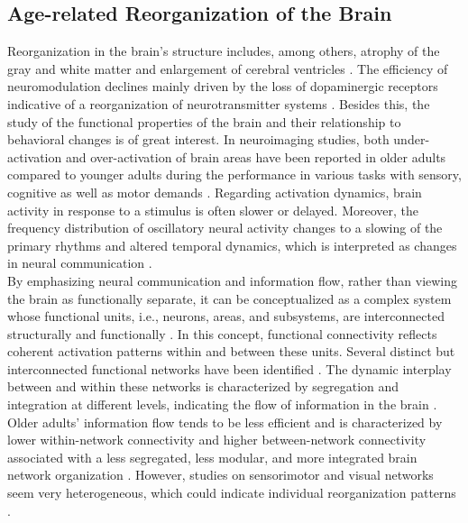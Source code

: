 \subsection{Age-related Reorganization of the Brain}
\label{theory:aging:brain}
Reorganization in the brain's structure includes, among others, atrophy of the gray and white matter and enlargement of cerebral ventricles \cite{Fjell2010}. The efficiency of neuromodulation declines mainly driven by the loss of dopaminergic receptors indicative of a reorganization of neurotransmitter systems \cite{Li2001}. Besides this, the study of the functional properties of the brain and their relationship to behavioral changes is of great interest. In neuroimaging studies, both under-activation and over-activation of brain areas have been reported in older adults compared to younger adults during the performance in various tasks with sensory, cognitive as well as motor demands \cite{Reuter-Lorenz2010, Sala-Llonch2015}. Regarding activation dynamics, brain activity in response to a stimulus is often slower or delayed. Moreover, the frequency distribution of oscillatory neural activity changes to a slowing of the primary rhythms and altered temporal dynamics, which is interpreted as changes in neural communication \cite{Courtney2021}.\\ 
By emphasizing neural communication and information flow, rather than viewing the brain as functionally separate, it can be conceptualized as a complex system whose functional units, i.e., neurons, areas, and subsystems, are interconnected structurally and functionally \cite{Friston2011,Deery2023}. In this concept, functional connectivity reflects coherent activation patterns within and between these units. Several distinct but interconnected functional networks have been identified \cite{Uddin2019}. The dynamic interplay between and within these networks is characterized by segregation and integration at different levels, indicating the flow of information in the brain \cite{Sporns2013}. Older adults' information flow tends to be less efficient and is characterized by lower within-network connectivity and higher between-network connectivity associated with a less segregated, less modular, and more integrated brain network organization \cite{Sala-Llonch2015,Deery2023, Betzel2014}. However, studies on sensorimotor and visual networks seem very heterogeneous, which could indicate individual reorganization patterns \cite{Deery2023}.


